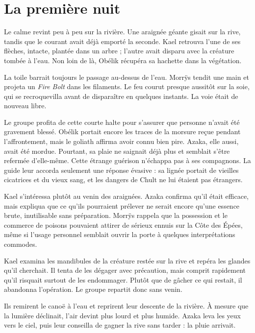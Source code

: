 \chapter{La première nuit}

Le calme revint peu à peu sur la rivière. Une araignée géante gisait sur la rive, tandis que le courant avait déjà emporté la seconde. Kael retrouva l'une de ses flèches, intacte, plantée dans un arbre ; l'autre avait disparu avec la créature tombée à l'eau. Non loin de là, Obélik récupéra sa hachette dans la végétation.

La toile barrait toujours le passage au-dessus de l'eau. Morrÿs tendit une main et projeta un \textit{Fire Bolt} dans les filaments. Le feu courut presque aussitôt sur la soie, qui se recroquevilla avant de disparaître en quelques instants. La voie était de nouveau libre.

Le groupe profita de cette courte halte pour s'assurer que personne n'avait été gravement blessé. Obélik portait encore les traces de la morsure reçue pendant l'affrontement, mais le goliath affirma avoir connu bien pire. Azaka, elle aussi, avait été mordue. Pourtant, sa plaie ne saignait déjà plus et semblait s'être refermée d'elle-même. Cette étrange guérison n'échappa pas à ses compagnons. La guide leur accorda seulement une réponse évasive : sa lignée portait de vieilles cicatrices et du vieux sang, et les dangers de Chult ne lui étaient pas étrangers.

Kael s'intéressa plutôt au venin des araignées. Azaka confirma qu'il était efficace, mais expliqua que ce qu'ils pourraient prélever ne serait encore qu'une essence brute, inutilisable sans préparation. Morrÿs rappela que la possession et le commerce de poisons pouvaient attirer de sérieux ennuis sur la Côte des Épées, même si l'usage personnel semblait ouvrir la porte à quelques interprétations commodes.

Kael examina les mandibules de la créature restée sur la rive et repéra les glandes qu'il cherchait. Il tenta de les dégager avec précaution, mais comprit rapidement qu'il risquait surtout de les endommager. Plutôt que de gâcher ce qui restait, il abandonna l'opération. Le groupe repartit donc sans venin.

\scenebreak

Ils remirent le canoë à l'eau et reprirent leur descente de la rivière. À mesure que la lumière déclinait, l'air devint plus lourd et plus humide. Azaka leva les yeux vers le ciel, puis leur conseilla de gagner la rive sans tarder : la pluie arrivait.

